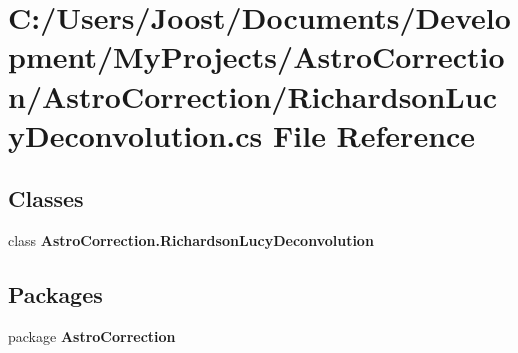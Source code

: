 \section{C:/Users/Joost/Documents/Development/MyProjects/AstroCorrection/AstroCorrection/RichardsonLucyDeconvolution.cs File Reference}
\label{_richardson_lucy_deconvolution_8cs}
\subsection*{Classes}
\begin{DoxyCompactItemize}
\item 
class {\bf AstroCorrection.RichardsonLucyDeconvolution}
\end{DoxyCompactItemize}
\subsection*{Packages}
\begin{DoxyCompactItemize}
\item 
package {\bf AstroCorrection}
\end{DoxyCompactItemize}
